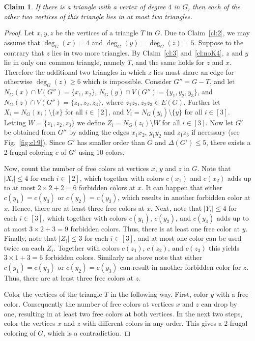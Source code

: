 \documentclass[11pt]{article}
\newtheorem{claim}{Claim}
\begin{document}
\begin{claim} If there is a triangle with a vertex of degree $4$ in $G$, then each of the other two vertices of this triangle lies in at most two triangles.
\label{cl:9}
\end{claim} 
\begin{proof}
Let $x,y,z$ be the vertices of a triangle $T$ in $G$. Due to Claim~\ref{cl:2}, we may assume that $\deg_G(x)=4$ and $\deg_G(y)=\deg_G(z)=5$. Suppose to the contrary that $z$ lies in two more triangles. By Claim~\ref{cl:3} and~\ref{cl:noK4}, $z$ and $y$ lie in only one common triangle, namely $T$, and the same holds for $z$ and $x$. Therefore the additional two triangles in which $z$ lies must share an edge for otherwise $\deg_G(z)\ge 6$ which is impossible. Consider $G''=G-T$, and let $N_G(x) \cap V(G'')=\{x_1,x_2\}$, $N_G(y) \cap V(G'')=\{y_1,y_2,y_3\}$, and $N_G(z) \cap V(G'')=\{z_1,z_2,z_3\}$, where $z_1z_2, z_2z_3 \in E(G)$. Further let $X_i=N_G(x_i)\setminus\{x\}$ for all $i\in[2]$, and $Y_i=N_G(y_i)\setminus\{y\}$ for all $i\in [3]$. Letting $W=\{z_1,z_2,z_3\}$ we define $Z_i=N_G(z_i)\setminus W$ for all $i \in [3]$. Now let $G'$ be obtained from $G''$ by adding the edges $x_1x_2$, $y_1y_2$ and $z_1z_3$ if necessary (see Fig.~\ref{fig:cl:9}). Since $G'$ has smaller order than $G$ and $\Delta(G') \le 5$, there exists a $2$-frugal coloring $c$ of $G'$ using $10$ colors.

Now, count the number of free colors at vertices $x$, $y$ and $z$ in $G$. Note that $|X_i| \le 4$ for each $i\in [2]$, which together with colors $c(x_1)$ and $c(x_2)$ adds up to at most $2 \times 2 + 2=6$ forbidden colors at $x$. It can happen that either $c(y_1)=c(y_3)$ or $c(y_2)=c(y_3)$, which results in another forbidden color at $x$. Hence, there are at least three free colors at $x$. Next, note that $|Y_i| \le 4$ for each $i\in [3]$, which together with colors $c(y_1)$, $c(y_2)$, and $c(y_3)$ adds up to at most $3 \times 2 +3=9$ forbidden colors. Thus, there is at least one free color at $y$. Finally, note that $|Z_i| \le 3$ for each $i\in [3]$, and at most one color can be used twice on each $Z_i$. Together with colors $c(z_1)$, $c(z_2)$, and $c(z_3)$ this yields $3 \times 1 +3=6$ forbidden colors. Similarly as above note that either $c(y_1)=c(y_3)$ or $c(y_2)=c(y_3)$ can result in another forbidden color for $z$. Thus, there are at least three free colors at $z$.

Color the vertices of the triangle $T$ in the following way. First, color $y$ with a free color. Consequently the number of free colors at vertices $x$ and $z$ can drop by one, resulting in at least two free colors at both vertices. In the next two steps, color the vertices $x$ and $z$ with different colors in any order. This gives a $2$-frugal coloring of $G$, which is a contradiction.
\end{proof}
\end{document}
